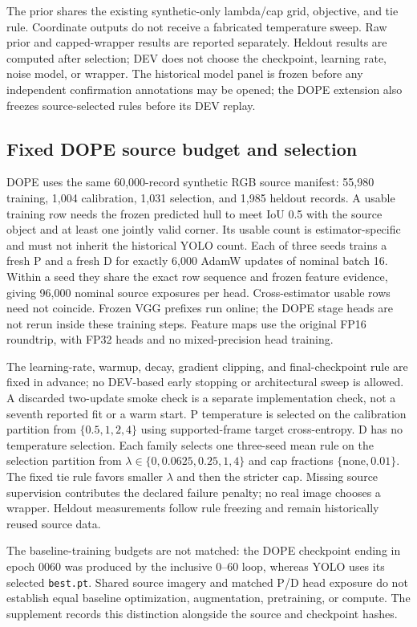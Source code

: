 \documentclass[journal]{IEEEtran}
\begin{document}
The prior shares the existing synthetic-only lambda/cap grid, objective, and tie rule. Coordinate outputs do not receive a fabricated temperature sweep. Raw prior and capped-wrapper results are reported separately. Heldout results are computed after selection; DEV does not choose the checkpoint, learning rate, noise model, or wrapper. The historical model panel is frozen before any independent confirmation annotations may be opened; the DOPE extension also freezes source-selected rules before its DEV replay.

\subsection{Fixed DOPE source budget and selection}
DOPE uses the same 60,000-record synthetic RGB source manifest: 55,980 training, 1,004 calibration, 1,031 selection, and 1,985 heldout records. A usable training row needs the frozen predicted hull to meet IoU 0.5 with the source object and at least one jointly valid corner. Its usable count is estimator-specific and must not inherit the historical YOLO count. Each of three seeds trains a fresh P and a fresh D for exactly 6,000 AdamW updates of nominal batch 16. Within a seed they share the exact row sequence and frozen feature evidence, giving 96,000 nominal source exposures per head. Cross-estimator usable rows need not coincide. Frozen VGG prefixes run online; the DOPE stage heads are not rerun inside these training steps. Feature maps use the original FP16 roundtrip, with FP32 heads and no mixed-precision head training.

The learning-rate, warmup, decay, gradient clipping, and final-checkpoint rule are fixed in advance; no DEV-based early stopping or architectural sweep is allowed. A discarded two-update smoke check is a separate implementation check, not a seventh reported fit or a warm start. P temperature is selected on the calibration partition from $\{0.5,1,2,4\}$ using supported-frame target cross-entropy. D has no temperature selection. Each family selects one three-seed mean rule on the selection partition from $\lambda\in\{0,0.0625,0.25,1,4\}$ and cap fractions $\{\mathrm{none},0.01\}$. The fixed tie rule favors smaller $\lambda$ and then the stricter cap. Missing source supervision contributes the declared failure penalty; no real image chooses a wrapper. Heldout measurements follow rule freezing and remain historically reused source data.

The baseline-training budgets are not matched: the DOPE checkpoint ending in epoch 0060 was produced by the inclusive 0--60 loop, whereas YOLO uses its selected \texttt{best.pt}. Shared source imagery and matched P/D head exposure do not establish equal baseline optimization, augmentation, pretraining, or compute. The supplement records this distinction alongside the source and checkpoint hashes.
\end{document}
